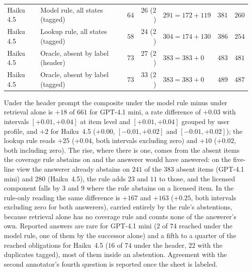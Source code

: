 \begin{table}[H]
\begin{tabular}{@{}llrrlrr@{}}
Haiku 4.5 & Model rule, all states (tagged) & $64$ & $26$ ($2$) & $291 = 172 + 119$ & $381$ & $260$ \\
Haiku 4.5 & Lookup rule, all states (tagged) & $58$ & $24$ ($2$) & $304 = 174 + 130$ & $386$ & $254$ \\
Haiku 4.5 & Oracle, absent by label (header) & $73$ & $27$ ($2$) & $383 = 383 + 0$ & $483$ & $481$ \\
Haiku 4.5 & Oracle, absent by label (tagged) & $73$ & $33$ ($2$) & $383 = 383 + 0$ & $489$ & $487$ \\
\bottomrule\end{tabular}
\end{table}

Under the header prompt the composite under the model rule minus under retrieval alone is $+18$ of $661$ for GPT-4.1 mini, a rate difference of $+0.03$ with intervals $[+0.01,+0.04]$ at item level and $[+0.01,+0.04]$ grouped by user profile, and $+2$ for Haiku~4.5 ($+0.00$, $[-0.01,+0.02]$ and $[-0.01,+0.02]$); the lookup rule reads $+25$ ($+0.04$, both intervals excluding zero) and $+10$ ($+0.02$, both including zero).
The rise, where there is one, comes from the absent items the coverage rule abstains on and the answerer would have answered: on the five-line view the answerer already abstains on $241$ of the $383$ absent items (GPT-4.1 mini) and $280$ (Haiku~4.5), the rule adds $23$ and $11$ to those, and the licensed component falls by $3$ and $9$ where the rule abstains on a licensed item.
In the rule-only reading the same difference is $+167$ and $+163$ ($+0.25$, both intervals excluding zero for both answerers), carried entirely by the rule's abstentions, because retrieval alone has no coverage rule and counts none of the answerer's own.
Reported answers are rare for GPT-4.1 mini ($2$ of $74$ reached under the model rule, one of them by the successor alone) and a fifth to a quarter of the reached obligations for Haiku~4.5 ($16$ of $74$ under the header, $22$ with the duplicates tagged), most of them inside an abstention.
Agreement with the second annotator's fourth question is reported once the sheet is labeled.
